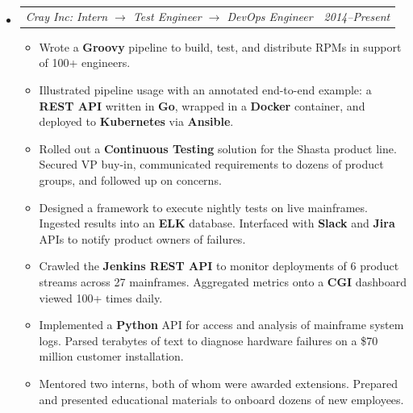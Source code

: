 \documentclass[12pt,letterpaper]{article}
\makeatletter
\newcommand{\headerpair}[2]{
    \begin{tabular*}{\linewidth}{l@{ \extracolsep{\fill} }r} {\large\emph{#1}} & {\large\emph{#2}}
    \end{tabular*}
}
\newcommand{\headerrow}[3]{\headerpair{#2: #1}{#3}}
\makeatother
\begin{document}
\begin{itemize}[leftmargin=\parindent]
    \parskip=0.1em
    \itemsep=1.2em
    \item[]
        \headerrow
            {Intern $\to$ Test Engineer $\to$ DevOps Engineer}
            {Cray Inc}
            {2014--Present}
        \begin{itemize}[leftmargin=\parindent]
            \itemsep=0.3em

            \item Wrote a \textbf{Groovy} pipeline to build, test, and distribute RPMs in support of 100+ engineers.

            \item Illustrated pipeline usage with an annotated end-to-end example: a \textbf{REST API} written in \textbf{Go}, wrapped in a \textbf{Docker} container, and deployed to \textbf{Kubernetes} via \textbf{Ansible}.

            \item Rolled out a \textbf{Continuous Testing} solution for the Shasta product line. Secured VP buy-in, communicated requirements to dozens of product groups, and followed up on concerns.

            \item Designed a framework to execute nightly tests on live mainframes. Ingested results into an \textbf{ELK} database. Interfaced with \textbf{Slack} and \textbf{Jira} APIs to notify product owners of failures.

            \item Crawled the \textbf{Jenkins REST API} to monitor deployments of 6 product streams across 27 mainframes. Aggregated metrics onto a \textbf{CGI} dashboard viewed 100+ times daily.

            \item Implemented a \textbf{Python} API for access and analysis of mainframe system logs. Parsed terabytes of text to diagnose hardware failures on a \$70 million customer installation.

            \item Mentored two interns, both of whom were awarded extensions. Prepared and presented educational materials to onboard dozens of new employees.




\end{itemize}
\end{itemize}
\end{document}
